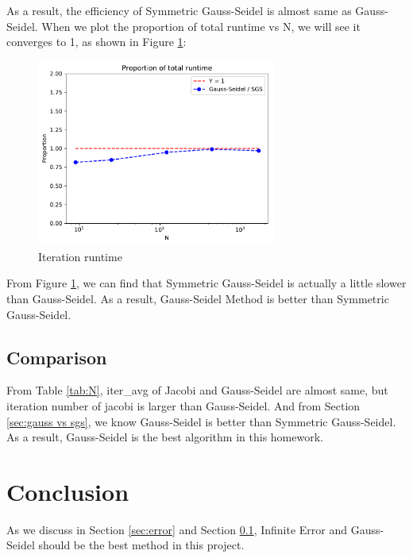 \documentclass{article}
\begin{document}
As a result, the efficiency of Symmetric Gauss-Seidel is almost same as Gauss-Seidel. When we plot the proportion of total runtime vs N,
we will see it converges to 1, as shown in Figure \ref{fig:gauss vs sgs runtime}:
\begin{figure}[H]
    \centering
    \includegraphics[width=0.7\textwidth]{src/gauss_sgs_runtime.pdf}
    \caption{Iteration runtime}
    \label{fig:gauss vs sgs runtime}
\end{figure}
From Figure \ref{fig:gauss vs sgs runtime}, we can find that Symmetric Gauss-Seidel is actually a little slower than Gauss-Seidel.
As a result, Gauss-Seidel Method is better than Symmetric Gauss-Seidel.

\subsection{Comparison}
\label{sec:comparison}
From Table \ref{tab:N}, iter\_avg of Jacobi and Gauss-Seidel are almost same, but iteration number of jacobi is larger than
Gauss-Seidel. And from Section \ref{sec:gauss vs sgs}, we know Gauss-Seidel is better than Symmetric Gauss-Seidel. As a result, 
Gauss-Seidel is the best algorithm in this homework.


\section{Conclusion}
As we discuss in Section \ref{sec:error} and Section \ref{sec:comparison}, Infinite Error and Gauss-Seidel should be the best 
method in this project.
\end{document}
